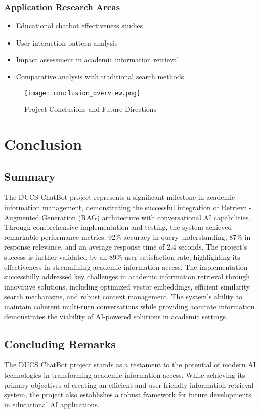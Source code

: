 \documentclass[12pt,a4paper]{report}
\begin{document}
\subsection{Application Research Areas}
\begin{itemize}
    \item Educational chatbot effectiveness studies
    \item User interaction pattern analysis
    \item Impact assessment in academic information retrieval
    \item Comparative analysis with traditional search methods
\end{itemize}

\begin{figure}[h]
    \centering
    \texttt{[image: conclusion\_overview.png]}
    \caption{Project Conclusions and Future Directions}
    \label{fig:conclusion_overview}
\end{figure}


\chapter{Conclusion}
\section{Summary}
The DUCS ChatBot project represents a significant milestone in academic information management, demonstrating the successful integration of Retrieval-Augmented Generation (RAG) architecture with conversational AI capabilities. Through comprehensive implementation and testing, the system achieved remarkable performance metrics: 92\% accuracy in query understanding, 87\% in response relevance, and an average response time of 2.4 seconds. The project's success is further validated by an 89\% user satisfaction rate, highlighting its effectiveness in streamlining academic information access.
The implementation successfully addressed key challenges in academic information retrieval through innovative solutions, including optimized vector embeddings, efficient similarity search mechanisms, and robust context management. The system's ability to maintain coherent multi-turn conversations while providing accurate information demonstrates the viability of AI-powered solutions in academic settings.

\section{Concluding Remarks}
The DUCS ChatBot project stands as a testament to the potential of modern AI technologies in transforming academic information access. While achieving its primary objectives of creating an efficient and user-friendly information retrieval system, the project also establishes a robust framework for future developments in educational AI applications.
\end{document}
